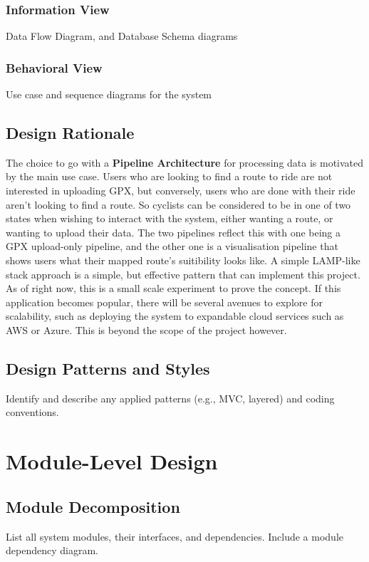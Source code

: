\documentclass[11pt,twoside]{report}
\begin{document}
\subsubsection{Information View}
Data Flow Diagram, and Database Schema diagrams
\subsubsection{Behavioral View}
Use case and sequence diagrams for the system

\subsection{Design Rationale}
The choice to go with a \textbf{Pipeline Architecture} for processing data is motivated by the main use case. Users who are looking
to find a route to ride are not interested in uploading GPX, but conversely, users who are done with their ride aren't looking to
find a route. So cyclists can be considered to be in one of two states when wishing to interact with the system, either wanting a route,
or wanting to upload their data. The two pipelines reflect this with one being a GPX upload-only pipeline, and the other one is a visualisation
pipeline that shows users what their mapped route's suitibility looks like.
A simple LAMP-like stack approach is a simple, but effective pattern that can implement this project. As of right now, this is a small scale
experiment to prove the concept. If this application becomes popular, there will be several avenues to explore for scalability, such as deploying the
system to expandable cloud services such as AWS or Azure. This is beyond the scope of the project however.

\subsection{Design Patterns and Styles}
Identify and describe any applied patterns (e.g., MVC, layered) and coding conventions.

\section{Module-Level Design}
\label{sec:moduledesign}
\subsection{Module Decomposition}
List all system modules, their interfaces, and dependencies. Include a module dependency diagram.
\end{document}
